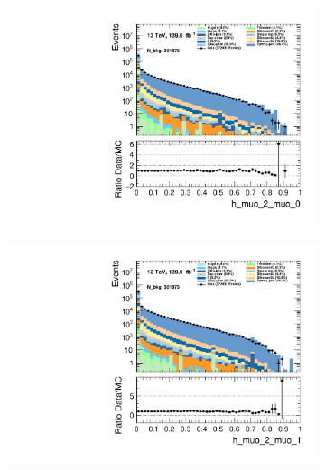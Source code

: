 \begin{figure}
    \centering
    \begin{subfigure}{.49\textwidth}
        \includegraphics[width=\textwidth]{Figures/MC_Data_comp/h_muo_2_muo_0.pdf}
        \caption{}
        \label{fig:et}
    \end{subfigure}
    \hfill
    \begin{subfigure}{.49\textwidth}
        \includegraphics[width=\textwidth]{Figures/MC_Data_comp/h_muo_2_muo_1.pdf}
        \caption{ }
        \label{fig:flcp}
    \end{subfigure}
    \hfill 
    \begin{subfigure}{.49\textwidth}

\end{subfigure}
\end{figure}
